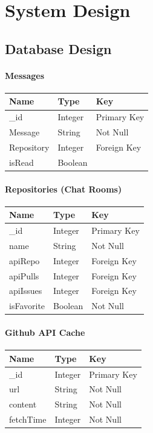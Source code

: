 \documentclass{report}
\begin{document}
\chapter{System Design}

\section{Database Design}

\subsubsection{Messages}
\begin{tabular}{| l | l | l |}
    \hline
    \textbf{Name} & \textbf{Type} & \textbf{Key}\\
    \hline
    \hline
    \_id & Integer & Primary Key \\
    \hline
    Message & String & Not Null\\
    \hline
    Repository & Integer & Foreign Key\\
    \hline
    isRead & Boolean & \\
    \hline

\end{tabular}
\subsubsection{Repositories (Chat Rooms)}
\begin{tabular}{| l | l | l |}
    \hline
    \textbf{Name} & \textbf{Type} & \textbf{Key}\\
    \hline
    \hline
    \_id & Integer & Primary Key \\
    \hline
    name & String & Not Null\\
    \hline
    apiRepo & Integer & Foreign Key\\
    \hline
    apiPulls & Integer & Foreign Key\\
    \hline
    apiIssues & Integer & Foreign Key\\
    \hline
    isFavorite & Boolean & Not Null\\
    \hline
\end{tabular}

\subsubsection{Github API Cache}
\begin{tabular}{| l | l | l |}
    \hline
    \textbf{Name} & \textbf{Type} & \textbf{Key}\\
    \hline
    \hline
    \_id & Integer & Primary Key \\
    \hline
    url & String & Not Null\\
    \hline
    content & String & Not Null\\
    \hline
    fetchTime & Integer & Not Null\\
    \hline
\end{tabular}
\end{document}
